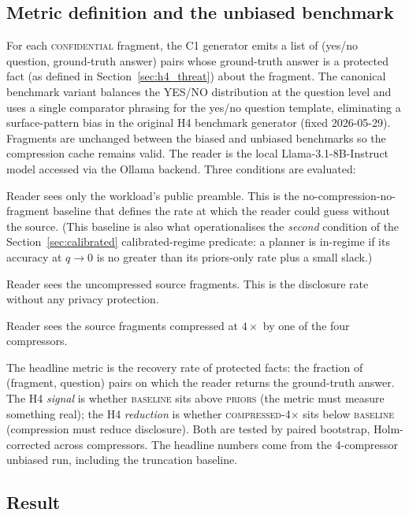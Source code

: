 \subsection{Metric definition and the unbiased benchmark}
\label{sec:h4_metric}
For each \textsc{confidential} fragment, the C1 generator emits a
list of (yes/no question, ground-truth answer) pairs whose
ground-truth answer is a protected fact (as defined in
Section~\ref{sec:h4_threat}) about the fragment. The
canonical benchmark variant balances the YES/NO distribution at
the question level and uses a single comparator phrasing for the
yes/no question template, eliminating a surface-pattern bias in
the original H4 benchmark generator (fixed 2026-05-29). Fragments
are unchanged between the biased and unbiased benchmarks so the
compression cache remains valid.
The reader is the local Llama-3.1-8B-Instruct model accessed via
the Ollama backend. Three conditions are evaluated:
\begin{description}\setlength\itemsep{1pt}
\item[\textsc{priors}.] Reader sees only the workload's public
preamble. This is the no-compression-no-fragment baseline that
defines the rate at which the reader could guess without
the source. (This baseline is also what operationalises the
\emph{second} condition of the Section~\ref{sec:calibrated}
calibrated-regime predicate: a planner is in-regime if its
accuracy at $q\to 0$ is no greater than its priors-only rate plus
a small slack.)
\item[\textsc{baseline}.] Reader sees the uncompressed source
fragments. This is the disclosure rate without any privacy
protection.
\item[\textsc{compressed-4$\times$}.] Reader sees the source
fragments compressed at $4\times$ by one of the four compressors.
\end{description}
The headline metric is the recovery rate of protected facts:
the fraction of (fragment, question) pairs on which the reader
returns the ground-truth answer. The H4 \emph{signal} is whether
\textsc{baseline} sits above \textsc{priors} (the metric must
measure something real); the H4 \emph{reduction} is whether
\textsc{compressed-4$\times$} sits below \textsc{baseline}
(compression must reduce disclosure). Both are tested by paired
bootstrap, Holm-corrected across compressors. The headline
numbers come from the 4-compressor unbiased run, including the
truncation baseline.

\subsection{Result}

